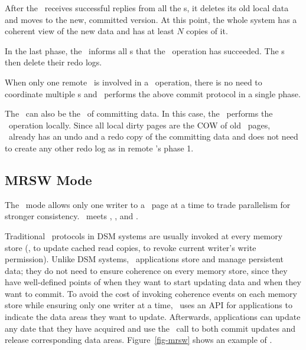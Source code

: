 After the \xn\ receives successful replies from all the \on{}s, 
it deletes its old local data and moves to the new, committed version. 
At this point, the whole system has a coherent view of the new data
and has at least $N$ copies of it.

In the last phase, the \xn\ informs all \on{}s that the \commitxact\ operation has succeeded.
The \on{}s then delete their redo logs.

When only one remote \on\ is involved in a \commitxact\ operation,
there is no need to coordinate multiple \on{}s
and \hotpot\ performs the above commit protocol in a single phase.

The \xn\ can also be the \on\ of committing data.
In this case, the \xn\ performs the \commitxact\ operation locally.
Since all local dirty pages are the COW of old \committed\ pages,
\xn\ already has an undo and a redo copy of the committing data
and does not need to create any other redo log as in remote \on's phase 1.

\subsection{MRSW Mode}
\label{sec:hotpot:mrsw}

The \mrsw\ mode allows only one writer to a \nvm\ page at a time
to trade parallelism for stronger consistency. 
\mrsw\ meets \ra, \rcm, and \re.

Traditional \mrsw\ protocols in DSM systems are usually invoked at every memory store
(\eg, to update cached read copies, to revoke current writer's write permission).
Unlike DSM systems, \dsnvm\ applications store and manage persistent data;
they do not need to ensure coherence on every memory store,
since they have well-defined points of when they want to start updating data and when they want to commit.
To avoid the cost of invoking coherence events on each memory store
while ensuring only one writer at a time, 
\hotpot\ uses an {\em \acquire} API for applications to indicate the data areas they want to update.
Afterwards, applications can update any date that they have acquired and use the \commitxact\ call to both 
commit updates and release corresponding data areas.
Figure~\ref{fig-mrsw} shows an example of \mrsw. %

